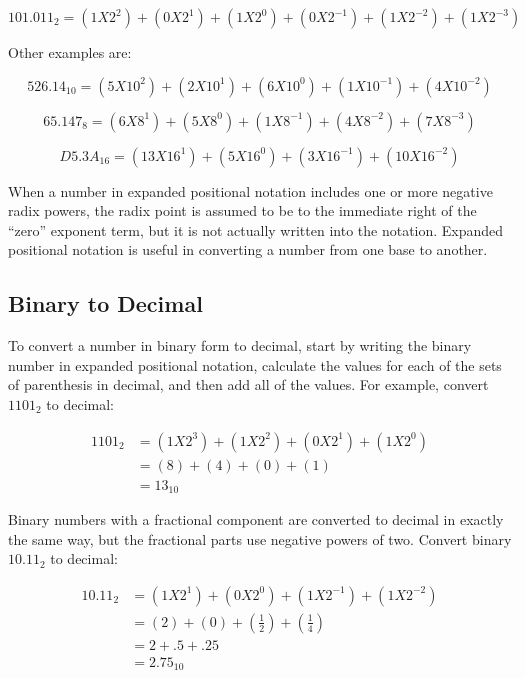 \begin{equation}
101.011_2=(1X2^2)+(0X2^1)+(1X2^0)+(0X2^{-1})+(1X2^{-2})+(1X2^{-3})
\end{equation}

Other examples are:

\begin{equation}
526.14_{10}=(5X10^2)+(2X10^1)+(6X10^0)+(1X10^{-1})+(4X10^{-2})
\end{equation}

\begin{equation}
65.147_8=(6X8^1)+(5X8^0)+(1X8^{-1})+(4X8^{-2})+(7X8^{-3})
\end{equation}

\begin{equation}
D5.3A_{16}=(13X16^1)+(5X16^0)+(3X16^{-1})+(10X16^{-2})
\end{equation}

When a number in expanded positional notation includes one or more negative radix powers, the radix point is assumed to be to the immediate right of the ``zero'' exponent term, but it is not actually written into the notation. Expanded positional notation is useful in converting a number from one base to another. 

\subsection{Binary to Decimal}
\label{MF:sub:binary_to_decimal}
To convert a number in binary form to decimal, start by writing the binary number in expanded positional notation, calculate the values for each of the sets of parenthesis in decimal, and then add all of the values. For example, convert $ 1101_2 $ to decimal:

\begin{align}
  1101_2 &= (1X2^3)+(1X2^2)+(0X2^1)+(1X2^0) \\
  \nonumber
  &= (8)+(4)+(0)+(1) \\
  \nonumber
  &= 13_{10}
\end{align}

Binary numbers with a fractional component are converted to decimal in exactly the same way, but the fractional parts use negative powers of two. Convert binary $ 10.11_2 $ to decimal: 

\begin{align}
  10.11_2 &= (1X2^1)+(0X2^0)+(1X2^{-1})+(1X2^{-2}) \\
  \nonumber
  &= (2)+(0)+(\frac{1}{2})+(\frac{1}{4}) \\
  \nonumber
  &= 2+.5+.25 \\
  \nonumber
  &= 2.75_{10}
\end{align}


